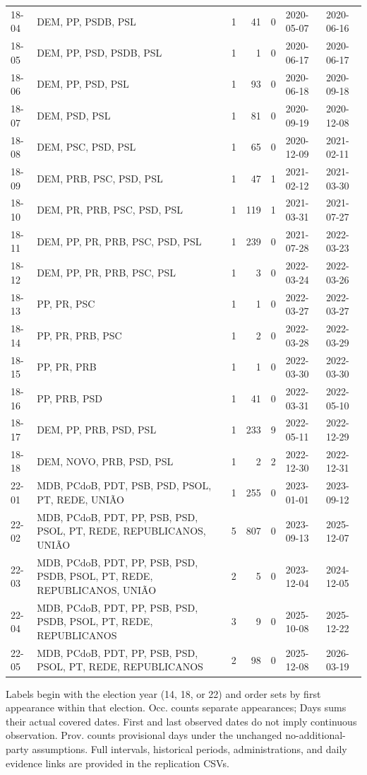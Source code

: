 \begin{landscape}
\begin{longtable}{@{}lp{12.2cm}rrrll@{}}
18-04 & DEM, PP, PSDB, PSL & 1 & 41 & 0 & 2020-05-07 & 2020-06-16 \\
18-05 & DEM, PP, PSD, PSDB, PSL & 1 & 1 & 0 & 2020-06-17 & 2020-06-17 \\
18-06 & DEM, PP, PSD, PSL & 1 & 93 & 0 & 2020-06-18 & 2020-09-18 \\
18-07 & DEM, PSD, PSL & 1 & 81 & 0 & 2020-09-19 & 2020-12-08 \\
18-08 & DEM, PSC, PSD, PSL & 1 & 65 & 0 & 2020-12-09 & 2021-02-11 \\
18-09 & DEM, PRB, PSC, PSD, PSL & 1 & 47 & 1 & 2021-02-12 & 2021-03-30 \\
18-10 & DEM, PR, PRB, PSC, PSD, PSL & 1 & 119 & 1 & 2021-03-31 & 2021-07-27 \\
18-11 & DEM, PP, PR, PRB, PSC, PSD, PSL & 1 & 239 & 0 & 2021-07-28 & 2022-03-23 \\
18-12 & DEM, PP, PR, PRB, PSC, PSL & 1 & 3 & 0 & 2022-03-24 & 2022-03-26 \\
18-13 & PP, PR, PSC & 1 & 1 & 0 & 2022-03-27 & 2022-03-27 \\
18-14 & PP, PR, PRB, PSC & 1 & 2 & 0 & 2022-03-28 & 2022-03-29 \\
18-15 & PP, PR, PRB & 1 & 1 & 0 & 2022-03-30 & 2022-03-30 \\
18-16 & PP, PRB, PSD & 1 & 41 & 0 & 2022-03-31 & 2022-05-10 \\
18-17 & DEM, PP, PRB, PSD, PSL & 1 & 233 & 9 & 2022-05-11 & 2022-12-29 \\
18-18 & DEM, NOVO, PRB, PSD, PSL & 1 & 2 & 2 & 2022-12-30 & 2022-12-31 \\
22-01 & MDB, PCdoB, PDT, PSB, PSD, PSOL, PT, REDE, UNIÃO & 1 & 255 & 0 & 2023-01-01 & 2023-09-12 \\
22-02 & MDB, PCdoB, PDT, PP, PSB, PSD, PSOL, PT, REDE, REPUBLICANOS, UNIÃO & 5 & 807 & 0 & 2023-09-13 & 2025-12-07 \\
22-03 & MDB, PCdoB, PDT, PP, PSB, PSD, PSDB, PSOL, PT, REDE, REPUBLICANOS, UNIÃO & 2 & 5 & 0 & 2023-12-04 & 2024-12-05 \\
22-04 & MDB, PCdoB, PDT, PP, PSB, PSD, PSDB, PSOL, PT, REDE, REPUBLICANOS & 3 & 9 & 0 & 2025-10-08 & 2025-12-22 \\
22-05 & MDB, PCdoB, PDT, PP, PSB, PSD, PSOL, PT, REDE, REPUBLICANOS & 2 & 98 & 0 & 2025-12-08 & 2026-03-19 \\
\bottomrule
\end{longtable}
\noindent\footnotesize Labels begin with the election year (14, 18, or 22) and order sets by first appearance within that election. Occ. counts separate appearances; Days sums their actual covered dates. First and last observed dates do not imply continuous observation. Prov. counts provisional days under the unchanged no-additional-party assumptions. Full intervals, historical periods, administrations, and daily evidence links are provided in the replication CSVs.
\end{landscape}
